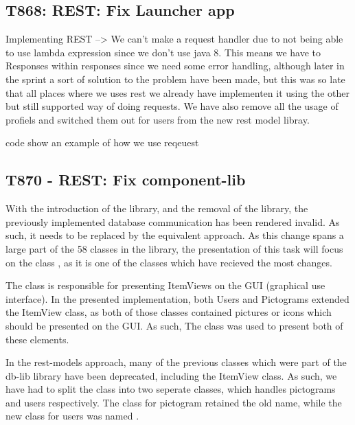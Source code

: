 
\subsection{T868: REST: Fix Launcher app}
Implementing REST --> We can't make a request handler due to not being able
to use lambda expression since we don't use java 8.
This means we have to Responses within responses since we need some error
handling, although later in the sprint a sort of solution to the problem have
been made, but this was so late that all places where we uses rest we already
have implementen it using the other but still supported way of doing requests.
We have also remove all the usage of profiels and switched them out for users
from the new rest model libray.

code show an example of how we use reqeuest

\subsection{T870 - REST: Fix component-lib}
With the introduction of the  library, and the removal of the
 library, the previously implemented database communication has
been rendered invalid. As such, it needs to be replaced by the equivalent
 approach. As this change spans a large part of the 58
classes in the  library, the presentation of this task will
focus on the class , as it is one of the
classes which have recieved the most changes.\nl

The  class is responsible for presenting ItemViews
on the GUI (graphical use interface). In the presented implementation, both
Users and Pictograms extended the ItemView class, as both of those classes
contained pictures or icons which should be presented on the GUI. As such, The
 class was used to present both of these
elements.\nl

In the rest-models approach, many of the previous classes which were part of
the db-lib library have been deprecated, including the ItemView class. As such,
we have had to split the  class into two seperate
classes, which handles pictograms and users respectively. The class for
pictogram retained the old name, while the new class for users was named
.\nl

